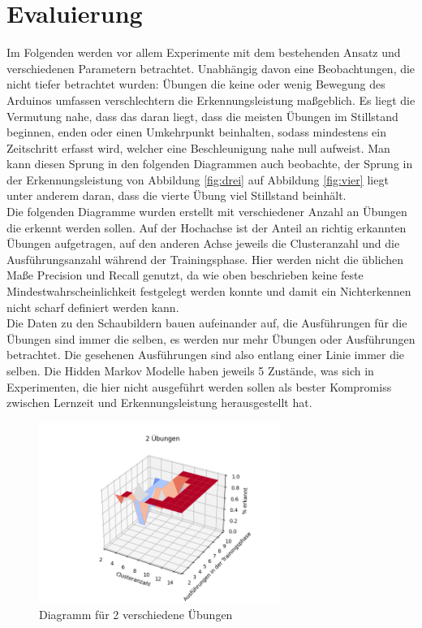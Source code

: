 \documentclass{article}
\begin{document}
\section{Evaluierung}
\label{sec:evaluation}
Im Folgenden werden vor allem Experimente mit dem bestehenden Ansatz und verschiedenen Parametern betrachtet.
Unabhängig davon eine Beobachtungen, die nicht tiefer betrachtet wurden:
Übungen die keine oder wenig Bewegung des Arduinos umfassen verschlechtern die Erkennungsleistung maßgeblich.
Es liegt die Vermutung nahe, dass das daran liegt, dass die meisten Übungen im Stillstand beginnen, enden oder einen \glqq Umkehrpunkt \grqq{} beinhalten, sodass mindestens ein Zeitschritt erfasst wird, welcher eine Beschleunigung nahe null aufweist.
Man kann diesen Sprung in den folgenden Diagrammen auch beobachte, der Sprung in der Erkennungsleistung von Abbildung \ref{fig:drei} auf Abbildung \ref{fig:vier} liegt unter anderem daran, dass die vierte Übung viel Stillstand beinhält.\\
Die folgenden Diagramme wurden erstellt mit verschiedener Anzahl an Übungen die erkennt werden sollen.
Auf der Hochachse ist der Anteil an richtig erkannten Übungen aufgetragen, auf den anderen Achse jeweils die Clusteranzahl und die Ausführungsanzahl während der Trainingsphase.
Hier werden nicht die üblichen Maße Precision und Recall genutzt, da wie oben beschrieben keine feste Mindestwahrscheinlichkeit festgelegt werden konnte und damit ein Nichterkennen nicht scharf definiert werden kann.\\
Die Daten zu den Schaubildern bauen aufeinander auf, die Ausführungen für die Übungen sind immer die selben, es werden nur mehr Übungen oder Ausführungen betrachtet.
Die gesehenen Ausführungen sind also entlang einer Linie immer die selben.
Die Hidden Markov Modelle haben jeweils 5 Zustände, was sich in Experimenten, die hier nicht ausgeführt werden sollen als bester Kompromiss zwischen Lernzeit und Erkennungsleistung herausgestellt hat.
\medskip
\begin{figure}[h]
\centering
\includegraphics[width=0.7\textwidth]{figures/2_graph.png}
\caption{Diagramm für 2 verschiedene Übungen}
\label{fig:zwei}
\end{figure}\\
\end{document}
